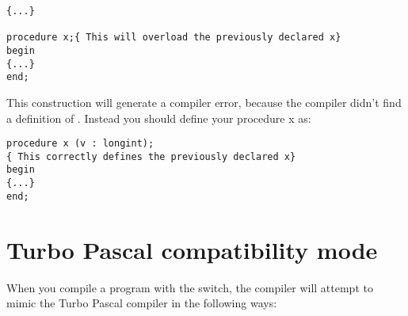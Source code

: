 \documentclass{report}
\begin{document}
\begin{enumerate}
\begin{verbatim}
{...} 

procedure x;{ This will overload the previously declared x}
begin
{...}
end;
\end{verbatim}
This construction will generate a compiler error, because the compiler
didn't find a definition of . Instead you
should define your procedure x as:
\begin{verbatim}
procedure x (v : longint);
{ This correctly defines the previously declared x}
begin
{...}
end;
\end{verbatim}
\end{enumerate}

\section{Turbo Pascal compatibility mode}
When you compile a program with the  switch, the compiler will
attempt to mimic the Turbo Pascal compiler in the following ways:
\end{document}
